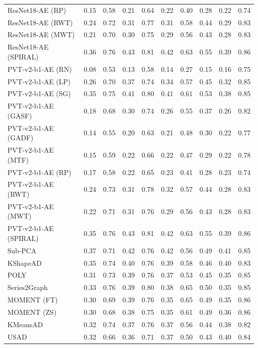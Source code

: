 \begin{table}
{\begin{tabular}{l|c|c|c|c|c|c|c|c|c}
ResNet18-AE (RP) & 0.15 & 0.58 & 0.21 & 0.64 & 0.22 & 0.40 & 0.28 & 0.22 & 0.74 \\
ResNet18-AE (RWT) & 0.24 & 0.72 & 0.31 & 0.77 & 0.31 & 0.58 & 0.44 & 0.29 & 0.83 \\
ResNet18-AE (MWT) & 0.21 & 0.70 & 0.30 & 0.75 & 0.29 & 0.56 & 0.43 & 0.28 & 0.83 \\
ResNet18-AE (SPIRAL) & 0.36 & 0.76 & 0.43 & 0.81 & 0.42 & 0.63 & 0.55 & 0.39 & 0.86 \\
\midrule
PVT-v2-b1-AE (RN) & 0.08 & 0.53 & 0.13 & 0.58 & 0.14 & 0.27 & 0.15 & 0.16 & 0.75 \\
PVT-v2-b1-AE (LP) & 0.26 & 0.70 & 0.37 & 0.74 & 0.34 & 0.57 & 0.45 & 0.32 & 0.85 \\
PVT-v2-b1-AE (SG) & 0.35 & 0.75 & 0.41 & 0.80 & 0.41 & 0.61 & 0.53 & 0.38 & 0.85 \\
PVT-v2-b1-AE (GASF) & 0.18 & 0.68 & 0.30 & 0.74 & 0.26 & 0.55 & 0.37 & 0.26 & 0.82 \\
PVT-v2-b1-AE (GADF) & 0.14 & 0.55 & 0.20 & 0.63 & 0.21 & 0.48 & 0.30 & 0.22 & 0.77 \\
PVT-v2-b1-AE (MTF) & 0.15 & 0.59 & 0.22 & 0.66 & 0.22 & 0.47 & 0.29 & 0.22 & 0.78 \\
PVT-v2-b1-AE (RP) & 0.17 & 0.58 & 0.22 & 0.65 & 0.23 & 0.41 & 0.28 & 0.23 & 0.74 \\
PVT-v2-b1-AE (RWT) & 0.24 & 0.73 & 0.31 & 0.78 & 0.32 & 0.57 & 0.44 & 0.28 & 0.83 \\
PVT-v2-b1-AE (MWT) & 0.22 & 0.71 & 0.31 & 0.76 & 0.29 & 0.56 & 0.43 & 0.28 & 0.83 \\
PVT-v2-b1-AE (SPIRAL) & 0.35 & 0.76 & 0.43 & 0.81 & 0.42 & 0.63 & 0.55 & 0.39 & 0.86 \\
\midrule
Sub-PCA & 0.37 & 0.71 & 0.42 & 0.76 & 0.42 & 0.56 & 0.49 & 0.41 & 0.85 \\
KShapeAD & 0.35 & 0.74 & 0.40 & 0.76 & 0.39 & 0.58 & 0.46 & 0.40 & 0.83 \\
POLY & 0.31 & 0.73 & 0.39 & 0.76 & 0.37 & 0.53 & 0.45 & 0.35 & 0.85 \\
Series2Graph & 0.33 & 0.76 & 0.39 & 0.80 & 0.38 & 0.65 & 0.50 & 0.35 & 0.85 \\
MOMENT (FT) & 0.30 & 0.69 & 0.39 & 0.76 & 0.35 & 0.65 & 0.49 & 0.35 & 0.86 \\
MOMENT (ZS) & 0.30 & 0.68 & 0.38 & 0.75 & 0.35 & 0.61 & 0.49 & 0.36 & 0.86 \\
KMeansAD & 0.32 & 0.74 & 0.37 & 0.76 & 0.37 & 0.56 & 0.44 & 0.38 & 0.82 \\
USAD & 0.32 & 0.66 & 0.36 & 0.71 & 0.37 & 0.50 & 0.43 & 0.40 & 0.84 \\

\end{tabular}}
\end{table}
